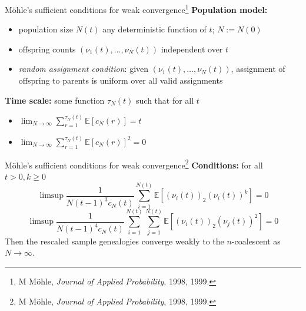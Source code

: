 \documentclass[aspectratio=169,fleqn]{beamer}
\theoremstyle{definition}
\newcommand{\E}{\mathbb{E}}
\begin{document}
\begin{frame}{M\"ohle's sufficient conditions for weak convergence\footnote[frame]{M M\"ohle, \textit{Journal of Applied Probability}, 1998, 1999.}}
    \pause
    \textbf{Population model:}
    \begin{itemize}
	\item population size $N(t)$ any deterministic function of $t$; $N:=N(0)$
	\item offspring counts $(\nu_1(t), \dots, \nu_N(t))$ independent over $t$
	\item \textit{random assignment condition}: given $(\nu_1(t), \dots, \nu_N(t))$, assignment of offspring to parents is uniform over all valid assignments
	\end{itemize}
	\pause
	\textbf{Time scale:} some function $\tau_N(t)$ such that for all $t$
	\begin{itemize}
	\item $\lim_{N\to\infty} \sum_{r=1}^{\tau_N(t)} \E[ c_N(r) ] = t$ 
	\item $\lim_{N\to\infty} \sum_{r=1}^{\tau_N(t)} \E[ c_N(r) ]^2 = 0$ 
	\end{itemize}
\end{frame}
\addtocounter{footnote}{-1}
\begin{frame}{M\"ohle's sufficient conditions for weak convergence\footnote[frame]{M M\"ohle, \textit{Journal of Applied Probability}, 1998, 1999.}}
    \textbf{Conditions:} for all $t>0, k\geq 0$
    \begin{equation*}
    \limsup \frac{1}{N(t-1)^3 c_N(t)} \sum_{i=1}^{N(t)} \E[ (\nu_i(t))_2 (\nu_i(t))^k ] =0
    \end{equation*}
    \begin{equation*}
    \limsup \frac{1}{N(t-1)^4 c_N(t)} \sum_{i=1}^{N(t)} \sum_{j=1}^{N(t)} \E[ (\nu_i(t))_2 (\nu_j(t))^2 ] =0 
    \end{equation*}
    \pause
    Then the rescaled sample genealogies converge weakly to the $n$-coalescent as $N\to\infty$.
\end{frame}
\end{document}
